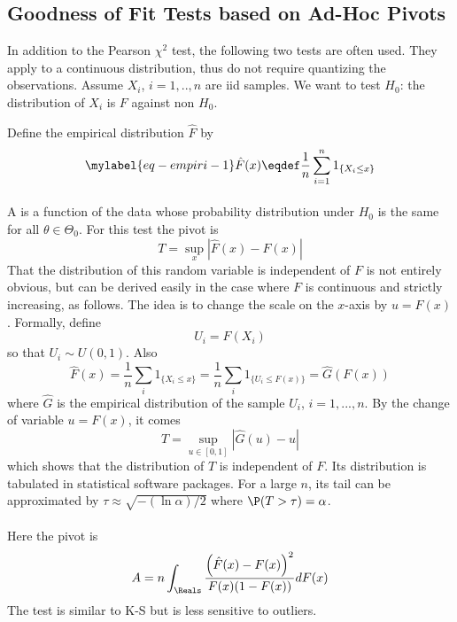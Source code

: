 \subsection{Goodness of Fit Tests based on Ad-Hoc Pivots}
\label{sec-skku}  In addition to the Pearson $\chi^2$ test, the
following two tests are often used. They apply to a continuous
distribution, thus do not require quantizing the observations.
Assume $X_i$, $i=1,..,n$ are iid samples. We want to test
$H_0$: the distribution of $X_i$ is $F$ against non $H_0$.

Define the empirical distribution $\hat{F}$ by
\begin{equation}\mylabel{eq-empiri-1}
  \hat{F}(x)\eqdef\frac{1}{n}\sum_{i=1}^n 1_{\{X_i \leq x\}}
\end{equation}


\paragraph{}
A  is a function of the data whose probability distribution under $H_0$ is the same for all $\theta \in\Theta_0$. For this test the pivot is
$$
T=\sup_x|\hat{F}(x)-F(x)|
$$
That the distribution of this random variable is independent of $F$ is not entirely obvious, but
can be derived easily in the case where $F$ is continuous and strictly increasing, as follows.
The idea is to change the scale on the $x$-axis by $u=F(x)$. Formally, define
$$
U_i=F(X_i)
$$
so that $U_i\sim U(0,1)$. Also
$$\hat{F}(x)=\frac{1}{n}\sum_i 1_{\{X_i \leq x\}}=\frac{1}{n}\sum_i 1_{\{U_i \leq
F(x)\}}=\hat{G}(F(x))$$ where $\hat{G}$ is the empirical distribution of the sample $U_i$,
$i=1,...,n$. By the change of variable $u=F(x)$, it comes
 $$T=\sup_{u\in[0,1]} |\hat{G}(u)-u|
 $$
which shows that the distribution of $T$ is independent of
$F$. Its distribution is tabulated in statistical software
packages. For a large $n$, its tail can be approximated by
$\tau \approx \sqrt{-(\ln \alpha)/2}$ where
$\P(T>\tau)=\alpha$.

\paragraph{}
Here the pivot is
$$
 A =n \int_{\Reals}\frac{\left(\hat{F}(x)-F(x)\right)^2}{F(x)(1-F(x))}dF(x)
$$
The test is similar to K-S but is less sensitive to outliers.


